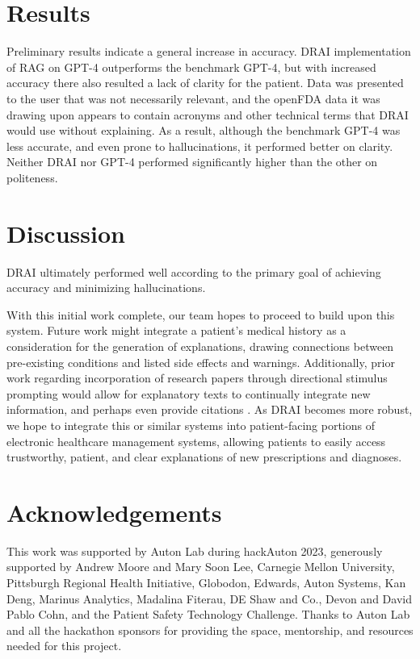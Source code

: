 \documentclass{article}
\begin{document}
\section{Results}
Preliminary results indicate a general increase in accuracy. DRAI implementation of RAG on GPT-4 outperforms the benchmark GPT-4, but with increased accuracy there also resulted a lack of clarity for the patient. Data was presented to the user that was not necessarily relevant, and the openFDA data it was drawing upon appears to contain acronyms and other technical terms that DRAI would use without explaining. As a result, although the benchmark GPT-4 was less accurate, and even prone to hallucinations, it performed better on clarity. Neither DRAI nor GPT-4 performed significantly higher than the other on politeness.

\section{Discussion}
DRAI ultimately performed well according to the primary goal of achieving accuracy and minimizing hallucinations. 

With this initial work complete, our team hopes to proceed to build upon this system. Future work might integrate a patient's medical history as a consideration for the generation of explanations, drawing connections between pre-existing conditions and listed side effects and warnings. Additionally, prior work regarding incorporation of research papers through directional stimulus prompting would allow for explanatory texts to continually integrate new information, and perhaps even provide citations \citep{li2023guiding}.
As DRAI becomes more robust, we hope to integrate this or similar systems into patient-facing portions of electronic healthcare management systems, allowing patients to easily access trustworthy, patient, and clear explanations of new prescriptions and diagnoses.

\section{Acknowledgements}
This work was supported by Auton Lab during hackAuton 2023, generously supported by Andrew Moore and Mary Soon Lee, Carnegie Mellon University, Pittsburgh Regional Health Initiative, Globodon, Edwards, Auton Systems, Kan Deng, Marinus Analytics, Madalina Fiterau, DE Shaw and Co., Devon and David Pablo Cohn, and the Patient Safety Technology Challenge. Thanks to Auton Lab and all the hackathon sponsors for providing the space, mentorship, and resources needed for this project.
\end{document}
